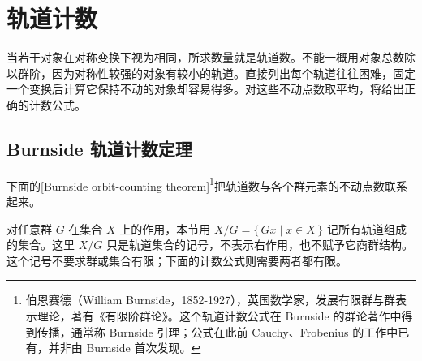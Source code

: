 
\section{轨道计数}
\label{b1:sec:0403}

当若干对象在对称变换下视为相同，所求数量就是轨道数。不能一概用对象总数除以群阶，因为对称性较强的对象有较小的轨道。直接列出每个轨道往往困难，固定一个变换后计算它保持不动的对象却容易得多。对这些不动点数取平均，将给出正确的计数公式。


%
%

\subsection{Burnside 轨道计数定理}
\label{b1:subsec:0403:01}

下面的[Burnside orbit-counting theorem]\footnote{伯恩赛德（William Burnside，1852-1927），英国数学家，发展有限群与群表示理论，著有《有限阶群论》。这个轨道计数公式在 Burnside 的群论著作中得到传播，通常称 Burnside 引理；公式在此前 Cauchy、Frobenius 的工作中已有，并非由 Burnside 首次发现。}把轨道数与各个群元素的不动点数联系起来。

\ProseParagraphBreak
对任意群 \(G\) 在集合 \(X\) 上的作用，本节用 \(X/G=\{\,Gx\mid x\in X\,\}\) 记所有轨道组成的集合。这里 \(X/G\) 只是轨道集合的记号，不表示右作用，也不赋予它商群结构。这个记号不要求群或集合有限；下面的计数公式则需要两者都有限。

